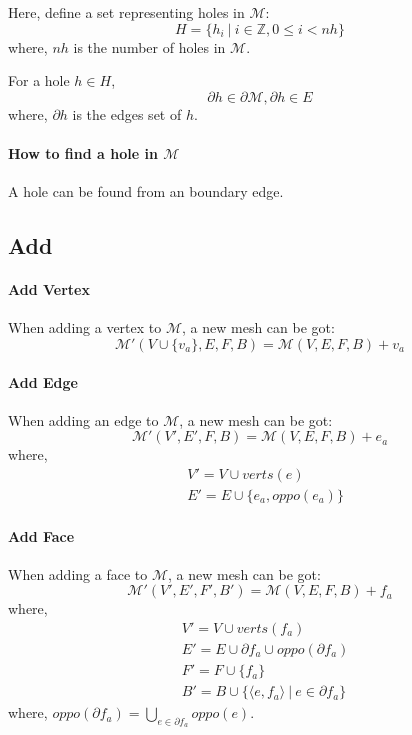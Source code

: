\documentclass[9pt,twocolumn]{extarticle}
\begin{document}
Here, define a set representing holes in $\mathcal{M}$:
\begin{equation}
H=\{h_i\ |\ i\in \mathbb{Z}, 0\leq i<nh\}
\end{equation}
where, $nh$ is the number of holes in $\mathcal{M}$.

For a hole $h\in H$,
\begin{equation}
\partial h\in \partial \mathcal{M}, \partial h\in E
\end{equation}
where, $\partial h$ is the edges set of $h$.

\paragraph{How to find a hole in $\mathcal{M}$} A hole can be found from
an boundary edge.

\subsection{Add}
\paragraph{Add Vertex} When adding a vertex to $\mathcal{M}$, a new mesh can be got:
\begin{equation}
\mathcal{M}'(V\cup\{v_a\},E,F,B)=\mathcal{M}(V,E,F,B)+v_a
\end{equation}

\paragraph{Add Edge} When adding an edge to $\mathcal{M}$, a new mesh can be got:
\begin{equation}
\mathcal{M}'(V',E',F,B)=\mathcal{M}(V,E,F,B)+e_a
\end{equation}
where,
\begin{align}
&V'=V\cup verts(e)\\
&E'=E\cup \{e_a,oppo(e_a)\}
\end{align}

\paragraph{Add Face} When adding a face to $\mathcal{M}$, a new mesh can be got:
\begin{equation}
\mathcal{M}'(V',E',F',B')=\mathcal{M}(V,E,F,B)+f_a
\end{equation}
where,
\begin{align}
&V'=V\cup verts(f_a)\\
&E'=E\cup \partial f_a \cup oppo(\partial f_a)\\
&F'=F\cup \{f_a\}\\
&B'=B\cup \{\langle e,f_a \rangle\ |\ e\in \partial f_a\}
\end{align}
where, $oppo(\partial f_a)=\bigcup_{e\in \partial f_a}oppo(e)$.
\end{document}
